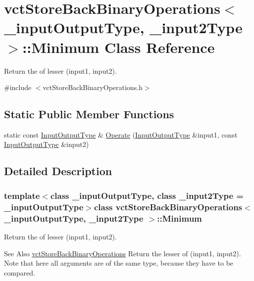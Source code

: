 \hypertarget{classvct_store_back_binary_operations_1_1_minimum}{\section{vct\-Store\-Back\-Binary\-Operations$<$ \-\_\-input\-Output\-Type, \-\_\-input2\-Type $>$\-:\-:Minimum Class Reference}
\label{classvct_store_back_binary_operations_1_1_minimum}
}


Return the of lesser (input1, input2).  




{\ttfamily \#include $<$vct\-Store\-Back\-Binary\-Operations.\-h$>$}

\subsection*{Static Public Member Functions}
\begin{DoxyCompactItemize}
\item 
static const \hyperlink{classvct_store_back_binary_operations_a9dc481d9e1345541dd5d833d5e5688f3}{Input\-Output\-Type} \& \hyperlink{classvct_store_back_binary_operations_1_1_minimum_a1638948796e62c57bf475e380a90b1b6}{Operate} (\hyperlink{classvct_store_back_binary_operations_a9dc481d9e1345541dd5d833d5e5688f3}{Input\-Output\-Type} \&input1, const \hyperlink{classvct_store_back_binary_operations_a9dc481d9e1345541dd5d833d5e5688f3}{Input\-Output\-Type} \&input2)
\end{DoxyCompactItemize}


\subsection{Detailed Description}
\subsubsection*{template$<$class \-\_\-input\-Output\-Type, class \-\_\-input2\-Type = \-\_\-input\-Output\-Type$>$class vct\-Store\-Back\-Binary\-Operations$<$ \-\_\-input\-Output\-Type, \-\_\-input2\-Type $>$\-::\-Minimum}

Return the of lesser (input1, input2). 

\begin{DoxySeeAlso}{See Also}
\hyperlink{classvct_store_back_binary_operations}{vct\-Store\-Back\-Binary\-Operations} Return the lesser of (input1, input2). Note that here all arguments are of the same type, because they have to be compared. 
\end{DoxySeeAlso}


